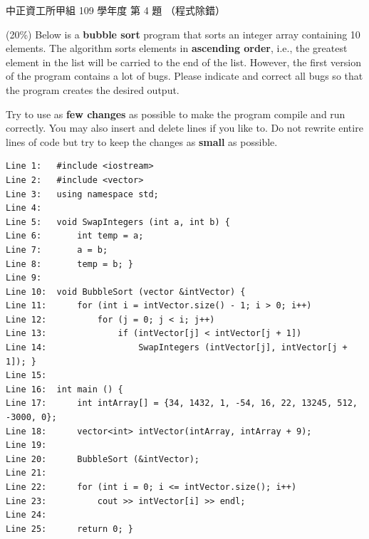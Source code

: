 \begin{pastexam}[label={px:ccu-109-swa-01}]{中正資工所甲組 109 學年度 第 4 題}
（程式除錯）

(20\%) Below is a \textbf{bubble sort} program that sorts an integer array containing 10 elements.
The algorithm sorts elements in \textbf{ascending order}, i.e., the greatest element in the list
will be carried to the end of the list. However, the first version of the program contains a lot
of bugs. Please indicate and correct all bugs so that the program creates the desired output.

Try to use as \textbf{few changes} as possible to make the program compile and run correctly. You
may also insert and delete lines if you like to. Do not rewrite entire lines of code but try to
keep the changes as \textbf{small} as possible.
\begin{verbatim}
Line 1:   #include <iostream>
Line 2:   #include <vector>
Line 3:   using namespace std;
Line 4:
Line 5:   void SwapIntegers (int a, int b) {
Line 6:       int temp = a;
Line 7:       a = b;
Line 8:       temp = b; }
Line 9:
Line 10:  void BubbleSort (vector &intVector) {
Line 11:      for (int i = intVector.size() - 1; i > 0; i++)
Line 12:          for (j = 0; j < i; j++)
Line 13:              if (intVector[j] < intVector[j + 1])
Line 14:                  SwapIntegers (intVector[j], intVector[j + 1]); }
Line 15:
Line 16:  int main () {
Line 17:      int intArray[] = {34, 1432, 1, -54, 16, 22, 13245, 512, -3000, 0};
Line 18:      vector<int> intVector(intArray, intArray + 9);
Line 19:
Line 20:      BubbleSort (&intVector);
Line 21:
Line 22:      for (int i = 0; i <= intVector.size(); i++)
Line 23:          cout >> intVector[i] >> endl;
Line 24:
Line 25:      return 0; }
\end{verbatim}
\end{pastexam}

